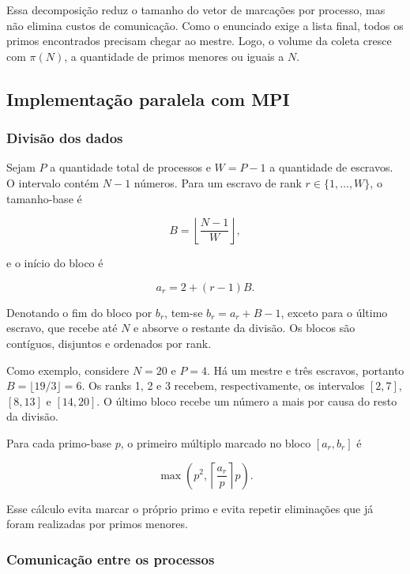 \documentclass[12pt,a4paper]{article}
\begin{document}
Essa decomposição reduz o tamanho do vetor de marcações por processo, mas não
elimina custos de comunicação. Como o enunciado exige a lista final, todos os
primos encontrados precisam chegar ao mestre. Logo, o volume da coleta cresce
com $\pi(N)$, a quantidade de primos menores ou iguais a $N$.

\subsection{Implementação paralela com MPI}

\subsubsection{Divisão dos dados}

Sejam $P$ a quantidade total de processos e $W=P-1$ a quantidade de
escravos. O intervalo contém $N-1$ números. Para um escravo de rank
$r\in\{1,\ldots,W\}$, o tamanho-base é

\begin{equation}
    B=\left\lfloor\frac{N-1}{W}\right\rfloor,
\end{equation}

e o início do bloco é

\begin{equation}
    a_r=2+(r-1)B.
\end{equation}

Denotando o fim do bloco por $b_r$, tem-se $b_r=a_r+B-1$, exceto para o último
escravo, que recebe até $N$ e absorve o restante da divisão. Os blocos são
contíguos, disjuntos e ordenados por rank.

Como exemplo, considere $N=20$ e $P=4$. Há um mestre e três escravos, portanto
$B=\lfloor19/3\rfloor=6$. Os ranks 1, 2 e 3 recebem, respectivamente, os
intervalos $[2,7]$, $[8,13]$ e $[14,20]$. O último bloco recebe um número a
mais por causa do resto da divisão.

Para cada primo-base $p$, o primeiro múltiplo marcado no bloco $[a_r,b_r]$ é

\begin{equation}
    \max\left(p^2,\left\lceil\frac{a_r}{p}\right\rceil p\right).
\end{equation}

Esse cálculo evita marcar o próprio primo e evita repetir eliminações que já
foram realizadas por primos menores.

\subsubsection{Comunicação entre os processos}
\end{document}
